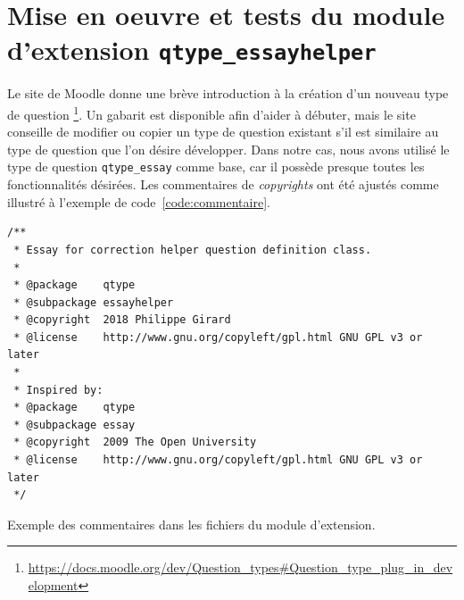 \chapter{Mise en oeuvre et tests du module d'extension \texttt{qtype\_essayhelper}}
Le site de Moodle donne une br\`eve introduction \`a la cr\'eation d'un nouveau type de question \footnote{\url{https://docs.moodle.org/dev/Question\_types\#Question\_type\_plug\_in\_development}}.
Un gabarit est disponible afin d'aider \`a d\'ebuter, mais le site conseille de modifier ou copier un type de question existant s'il est similaire au type de question que l'on d\'esire d\'evelopper.
Dans notre cas, nous avons utilis\'e le type de question \texttt{qtype\_essay} comme base, car il poss\`ede presque toutes les fonctionnalit\'es d\'esir\'ees.
Les commentaires de \emph{copyrights} ont \'et\'e ajust\'es comme illustr\'e \`a l'exemple de code~\ref{code:commentaire}.
\begin{lstfloat}
\begin{lstlisting}[frame=l]
/**
 * Essay for correction helper question definition class.
 *
 * @package    qtype
 * @subpackage essayhelper
 * @copyright  2018 Philippe Girard
 * @license    http://www.gnu.org/copyleft/gpl.html GNU GPL v3 or later
 *
 * Inspired by:
 * @package    qtype
 * @subpackage essay
 * @copyright  2009 The Open University
 * @license    http://www.gnu.org/copyleft/gpl.html GNU GPL v3 or later
 */
\end{lstlisting}
\caption{Exemple des commentaires dans les fichiers du module d'extension.}
\label{code:commentaire}
\end{lstfloat}
